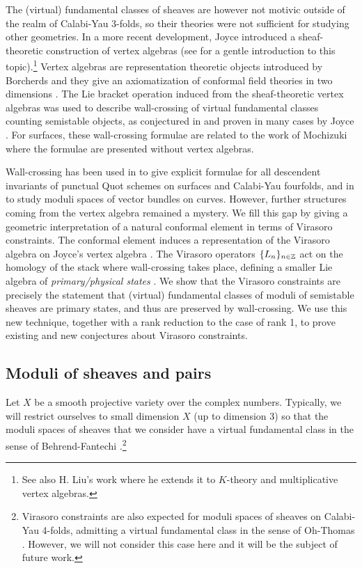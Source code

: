 \documentclass[a4paper, 12pt]{amsart}
\begin{document}
The (virtual) fundamental classes of sheaves are however not motivic outside of the realm of Calabi-Yau 3-folds, so their theories were not sufficient for studying other geometries. In a more recent development, Joyce \cite{Jo17} introduced a sheaf-theoretic construction of vertex algebras (see \cite{Borcherds, Ka98, LLVA} for a gentle introduction to this topic).\footnote{See also H. Liu's work \cite{Liu} where he extends it to $K$-theory and multiplicative vertex algebras.} Vertex algebras are representation theoretic objects introduced by Borcherds \cite{Borcherds} and they give an axiomatization of conformal field theories in two dimensions \cite{BPZ}. The Lie bracket operation induced from the sheaf-theoretic vertex algebras was used to describe wall-crossing of virtual fundamental classes counting semistable objects, as conjectured in \cite{GJT} and proven in many cases by Joyce \cite{Jo21}. For surfaces, these wall-crossing formulae are related to the work of Mochizuki \cite{mochizuki} where the formulae are presented without vertex algebras. 

Wall-crossing has been used in \cite{Bo21.5, Bo21} to give explicit formulae for all descendent invariants of punctual Quot schemes on surfaces and Calabi-Yau fourfolds, and in \cite{Bu22} to study moduli spaces of vector bundles on curves. However, further structures coming from the vertex algebra remained a mystery. We fill this gap by giving a geometric interpretation of a natural conformal element in terms of Virasoro constraints. The conformal element  induces a representation of the Virasoro algebra on Joyce's vertex algebra \cite{Jo17}. The Virasoro operators $\{L_n\}_{n\in {\mathbb{Z}}}$ act on the homology of the stack where wall-crossing takes place, defining a smaller Lie algebra of \textit{primary/physical states} \cite{BPZ,Borcherds}. We show that the Virasoro constraints are precisely the statement that (virtual) fundamental classes of moduli of semistable sheaves are primary states, and thus are preserved by wall-crossing. We use this new technique, together with a rank reduction to the case of rank 1, to prove existing and new conjectures about Virasoro constraints.


\subsection{Moduli of sheaves and pairs}
\label{sec: modulisheavespairs}

Let $X$ be a smooth projective variety over the complex numbers. Typically, we will restrict ourselves to small dimension $X$ (up to dimension 3) so that the moduli spaces of sheaves that we consider have a virtual fundamental class in the sense of Behrend-Fantechi \cite{BF}.\footnote{Virasoro constraints are also expected for moduli spaces of sheaves on Calabi-Yau 4-folds, admitting a virtual fundamental class in the sense of Oh-Thomas \cite{OT}. However, we will not consider this case here and it will be the subject of future work.} 
\end{document}

